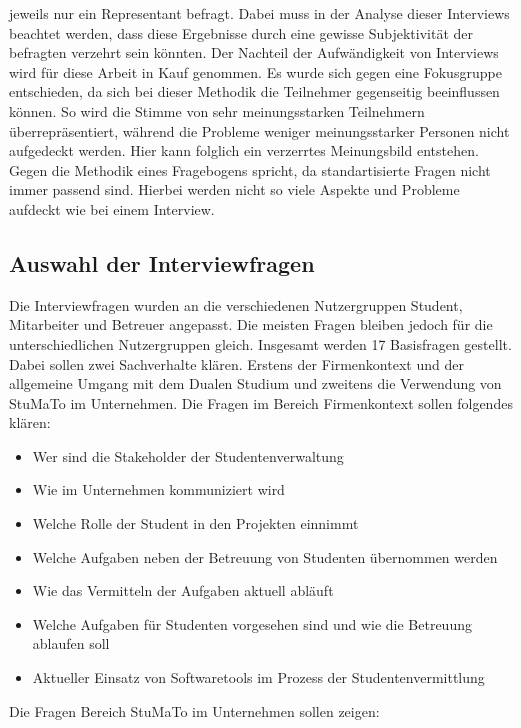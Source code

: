 \documentclass[
  12pt,
  ngerman,
  a4paper,
]{article}
\providecommand{\tightlist}{%
  \setlength{\itemsep}{0pt}\setlength{\parskip}{0pt}}
\begin{document}
jeweils nur ein Representant befragt. Dabei muss in der Analyse dieser
Interviews beachtet werden, dass diese Ergebnisse durch eine gewisse
Subjektivität der befragten verzehrt sein könnten. Der Nachteil der
Aufwändigkeit von Interviews wird für diese Arbeit in Kauf genommen. Es
wurde sich gegen eine Fokusgruppe entschieden, da sich bei dieser
Methodik die Teilnehmer gegenseitig beeinflussen können. So wird die
Stimme von sehr meinungsstarken Teilnehmern überrepräsentiert, während
die Probleme weniger meinungsstarker Personen nicht aufgedeckt werden.
Hier kann folglich ein verzerrtes Meinungsbild entstehen. Gegen die
Methodik eines Fragebogens spricht, da standartisierte Fragen nicht
immer passend sind. Hierbei werden nicht so viele Aspekte und Probleme
aufdeckt wie bei einem Interview.

\hypertarget{auswahl-der-interviewfragen}{%
\subsection{Auswahl der
Interviewfragen}\label{auswahl-der-interviewfragen}}

Die Interviewfragen wurden an die verschiedenen Nutzergruppen Student,
Mitarbeiter und Betreuer angepasst. Die meisten Fragen bleiben jedoch
für die unterschiedlichen Nutzergruppen gleich. Insgesamt werden 17
Basisfragen gestellt. Dabei sollen zwei Sachverhalte klären. Erstens der
Firmenkontext und der allgemeine Umgang mit dem Dualen Studium und
zweitens die Verwendung von StuMaTo im Unternehmen. Die Fragen im
Bereich Firmenkontext sollen folgendes klären:

\begin{itemize}
\tightlist
\item
  Wer sind die Stakeholder der Studentenverwaltung
\item
  Wie im Unternehmen kommuniziert wird
\item
  Welche Rolle der Student in den Projekten einnimmt
\item
  Welche Aufgaben neben der Betreuung von Studenten übernommen werden
\item
  Wie das Vermitteln der Aufgaben aktuell abläuft
\item
  Welche Aufgaben für Studenten vorgesehen sind und wie die Betreuung
  ablaufen soll
\item
  Aktueller Einsatz von Softwaretools im Prozess der
  Studentenvermittlung
\end{itemize}

Die Fragen Bereich StuMaTo im Unternehmen sollen zeigen:
\end{document}
